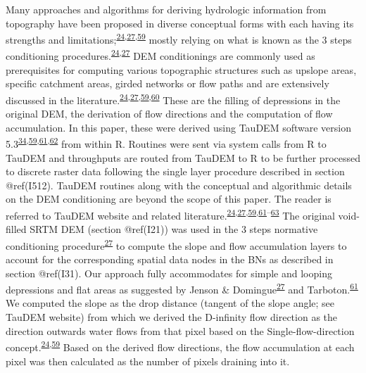 \documentclass[12pt,oneside]{article}
\begin{document}
Many approaches and algorithms for deriving hydrologic information from topography have been proposed in diverse conceptual forms with each having its strengths and limitations;\textsuperscript{\protect\hyperlink{ref-Arge_et_al_2003}{24},\protect\hyperlink{ref-Jenson_and_Domingue_1988}{27},\protect\hyperlink{ref-Tarboton_1997}{59}} mostly relying on what is known as the 3 steps conditioning procedures.\textsuperscript{\protect\hyperlink{ref-Arge_et_al_2003}{24},\protect\hyperlink{ref-Jenson_and_Domingue_1988}{27}} DEM conditionings are commonly used as prerequisites for computing various topographic structures such as upslope areas, specific catchment areas, girded networks or flow paths and are extensively discussed in the literature.\textsuperscript{\protect\hyperlink{ref-Arge_et_al_2003}{24},\protect\hyperlink{ref-Jenson_and_Domingue_1988}{27},\protect\hyperlink{ref-Tarboton_1997}{59},\protect\hyperlink{ref-OCallaghan_Mark_1984}{60}} These are the filling of depressions in the original DEM, the derivation of flow directions and the computation of flow accumulation. In this paper, these were derived using TauDEM software version 5.3\textsuperscript{\protect\hyperlink{ref-Yang_et_al_2006}{34},\protect\hyperlink{ref-Tarboton_1997}{59},\protect\hyperlink{ref-Tarboton_et_al_1991}{61},\protect\hyperlink{ref-Tesfa_et_al_2011}{62}} from within R. Routines were sent via system calls from R to TauDEM and throughputs are routed from TauDEM to R to be further processed to discrete raster data following the single layer procedure described in section @ref(I512). TauDEM routines along with the conceptual and algorithmic details on the DEM conditioning are beyond the scope of this paper. The reader is referred to TauDEM website and related literature.\textsuperscript{\protect\hyperlink{ref-Arge_et_al_2003}{24},\protect\hyperlink{ref-Jenson_and_Domingue_1988}{27},\protect\hyperlink{ref-Tarboton_1997}{59},\protect\hyperlink{ref-Tarboton_et_al_1991}{61}--\protect\hyperlink{ref-Wallis_et_al_2009}{63}}
The original void-filled SRTM DEM (section @ref(I21)) was used in the 3 steps normative conditioning procedure\textsuperscript{\protect\hyperlink{ref-Jenson_and_Domingue_1988}{27}} to compute the slope and flow accumulation layers to account for the corresponding spatial data nodes in the BNs as described in section @ref(I31). Our approach fully accommodates for simple and looping depressions and flat areas as suggested by Jenson \& Domingue\textsuperscript{\protect\hyperlink{ref-Jenson_and_Domingue_1988}{27}} and Tarboton.\textsuperscript{\protect\hyperlink{ref-Tarboton_et_al_1991}{61}} We computed the slope as the drop distance (tangent of the slope angle; see TauDEM website) from which we derived the D-infinity flow direction as the direction outwards water flows from that pixel based on the Single-ﬂow-direction concept.\textsuperscript{\protect\hyperlink{ref-Arge_et_al_2003}{24},\protect\hyperlink{ref-Tarboton_1997}{59}} Based on the derived flow directions, the flow accumulation at each pixel was then calculated as the number of pixels draining into it.
\end{document}
